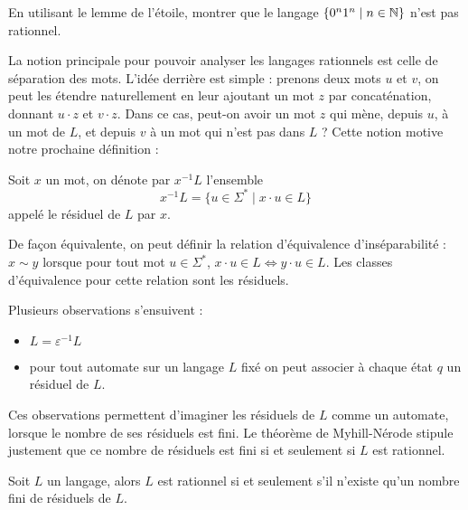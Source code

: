 \begin{exo}
    En utilisant le lemme de l'étoile, montrer que le langage $\{0^n1^n\mid n\in\mathbb{N}\}$ n'est pas rationnel.
\end{exo}

La notion principale pour pouvoir analyser les langages rationnels est celle de séparation des mots. L'idée derrière est simple : prenons deux mots $u$ et $v$, on peut les étendre naturellement en leur ajoutant un mot $z$ par concaténation, donnant $u\cdot z$ et $v\cdot z$. Dans ce cas, peut-on avoir un mot $z$ qui mène, depuis $u$, à un mot de $L$, et depuis $v$ à un mot qui n'est pas dans $L$ ? Cette notion motive notre prochaine définition :

\begin{defi}
    Soit $x$ un mot, on dénote par $x^{-1}L$ l'ensemble $$x^{-1}L=\{u\in \Sigma^*\mid x\cdot u \in L\}$$ appelé le résiduel de $L$ par $x$.

    De façon équivalente, on peut définir la relation d'équivalence d'inséparabilité : $x\sim y$ lorsque pour tout mot $u\in \Sigma^*$, $x\cdot u \in L \iff y\cdot u \in L$. Les classes d'équivalence pour cette relation sont les résiduels.
\end{defi}

Plusieurs observations s'ensuivent :
\begin{itemize}[label=$\bullet$]
    \item $L=\varepsilon^{-1}L$
    \item pour tout automate sur un langage $L$ fixé on peut associer à chaque état $q$ un résiduel de $L$.
\end{itemize}

Ces observations permettent d'imaginer les résiduels de $L$ comme un automate, lorsque le nombre de ses résiduels est fini. Le théorème de Myhill-Nérode stipule justement que ce nombre de résiduels est fini si et seulement si $L$ est rationnel.

\begin{them}
    Soit $L$ un langage, alors $L$ est rationnel si et seulement s'il n'existe qu'un nombre fini de résiduels de $L$.
\end{them}

